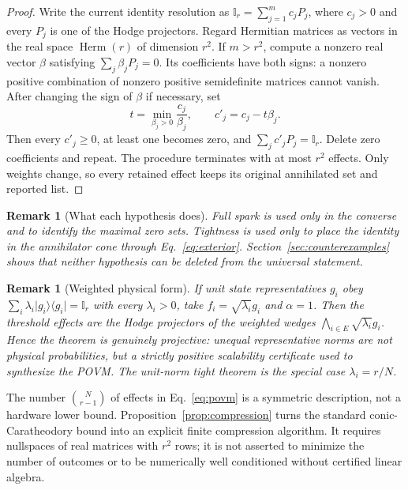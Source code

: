 \documentclass[11pt,a4paper]{article}
\newtheorem{remark}[theorem]{Remark}
\newcommand{\I}{\mathbb{I}}
\newcommand{\ket}[1]{\lvert #1\rangle}
\newcommand{\bra}[1]{\langle #1\rvert}
\newcommand{\proj}[1]{\ket{#1}\!\bra{#1}}
\begin{document}
\begin{proof}
Write the current identity resolution as
$\I_r=\sum_{j=1}^m c_jP_j$, where $c_j>0$ and every $P_j$ is one of the Hodge
projectors.  Regard Hermitian matrices as vectors in the real space
$\operatorname{Herm}(r)$ of dimension $r^2$.  If $m>r^2$, compute a nonzero
real vector $\beta$ satisfying $\sum_j\beta_jP_j=0$.  Its coefficients have
both signs: a nonzero positive combination of nonzero positive semidefinite
matrices cannot vanish.  After changing the sign of $\beta$ if necessary,
set
\[
 t=\min_{\beta_j>0}\frac{c_j}{\beta_j},
 \qquad c'_j=c_j-t\beta_j.
\]
Then every $c'_j\ge0$, at least one becomes zero, and
$\sum_jc'_jP_j=\I_r$.  Delete zero coefficients and repeat.  The procedure
terminates with at most $r^2$ effects.  Only weights change, so every retained
effect keeps its original annihilated set and reported list.
\end{proof}

\begin{remark}[What each hypothesis does]
Full spark is used only in the converse and to identify the maximal zero sets.
Tightness is used only to place the identity in the annihilator cone through
Eq.~\eqref{eq:exterior}.  Section~\ref{sec:counterexamples} shows that neither
hypothesis can be deleted from the universal statement.
\end{remark}

\begin{remark}[Weighted physical form]\label{rem:weighted}
If unit state representatives $g_i$ obey
$\sum_i\lambda_i\proj{g_i}=\I_r$ with every $\lambda_i>0$, take
$f_i=\sqrt{\lambda_i}g_i$ and $\alpha=1$.  Then the threshold effects are
the Hodge projectors of the weighted wedges
$\bigwedge_{i\in E}\sqrt{\lambda_i}g_i$.  Hence the theorem is genuinely
projective: unequal representative norms are not physical probabilities, but
a strictly positive scalability certificate used to synthesize the POVM.
The unit-norm tight theorem is the special case $\lambda_i=r/N$.
\end{remark}

The number $\binom{N}{r-1}$ of effects in Eq.~\eqref{eq:povm} is a symmetric
description, not a hardware lower bound.  Proposition~\ref{prop:compression}
turns the standard conic-Caratheodory bound into an explicit finite
compression algorithm.  It requires nullspaces of real matrices with $r^2$
rows; it is not asserted to minimize the number of outcomes or to be
numerically well conditioned without certified linear algebra.
\end{document}
